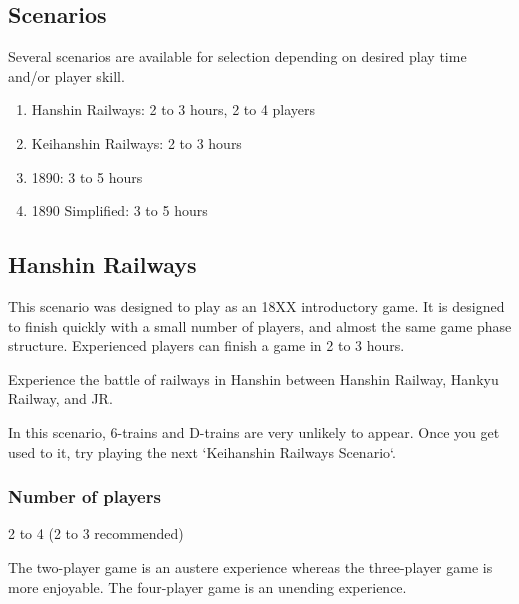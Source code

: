 \begin{multicols}{2}
\section{Scenarios}
\renewcommand*{\thesubsection}{\Alph{subsection}}
\newcommand{\myparagraph}[1]{\paragraph{#1}\mbox{}\\}


Several scenarios are available for selection depending on desired
play time and/or player skill.

\begin{enumerate}[label=\Alph*]
\item Hanshin Railways: 2 to 3 hours, 2 to 4 players
\item Keihanshin Railways: 2 to 3 hours
\item 1890: 3 to 5 hours
\item 1890 Simplified: 3 to 5 hours
\end{enumerate}

\setcounter{secnumdepth}{4}


\subsection{Hanshin Railways}

This scenario was designed to play as an 18XX introductory game. It is
designed to finish quickly with a small number of players, and almost
the same game phase structure. Experienced players can finish a game
in 2 to 3 hours.

Experience the battle of railways in Hanshin between Hanshin Railway,
Hankyu Railway, and JR.

In this scenario, 6-trains and D-trains are very unlikely to
appear. Once you get used to it, try playing the next `Keihanshin
Railways Scenario`.

\subsubsection{Number of players}

2 to 4 (2 to 3 recommended)

The two-player game is an austere experience whereas the three-player
game is more enjoyable. The four-player game is an unending
experience.


\end{multicols}
